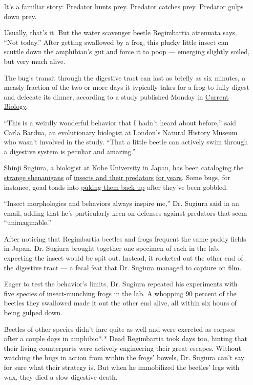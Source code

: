 It's a familiar story: Predator hunts prey. Predator catches prey.
Predator gulps down prey.

Usually, that's it. But the water scavenger beetle Regimbartia attenuata
says, ``Not today.'' After getting swallowed by a frog, this plucky
little insect can scuttle down the amphibian's gut and force it to poop
--- emerging slightly soiled, but very much alive.

The bug's transit through the digestive tract can last as briefly as six
minutes, a measly fraction of the two or more days it typically takes
for a frog to fully digest and defecate its dinner, according to a study
published Monday in
\href{http://dx.doi.org/10.1016/j.cub.2020.06.026}{Current Biology}.

``This is a weirdly wonderful behavior that I hadn't heard about
before,'' said Carla Bardua, an evolutionary biologist at London's
Natural History Museum who wasn't involved in the study. ``That a little
beetle can actively swim through a digestive system is peculiar and
amazing.''

Shinji Sugiura, a biologist at Kobe University in Japan, has been
cataloging the
\href{https://royalsocietypublishing.org/doi/10.1098/rsbl.2017.0647}{strange
shenanigans} of \href{https://peerj.com/articles/5942/}{insects and
their predators}
\href{https://onlinelibrary.wiley.com/doi/abs/10.1111/ens.12423}{for
years}. Some bugs, for instance, goad toads into
\href{https://www.nytimes.com/2018/02/06/science/bombardier-beetle-toad-vomit.html}{puking
them back up} after they've been gobbled.

``Insect morphologies and behaviors always inspire me,'' Dr. Sugiura
said in an email, adding that he's particularly keen on defenses against
predators that seem ``unimaginable.''

After noticing that Regimbartia beetles and frogs frequent the same
paddy fields in Japan, Dr. Sugiura brought together one specimen of each
in the lab, expecting the insect would be spit out. Instead, it rocketed
out the other end of the digestive tract --- a fecal feat that Dr.
Sugiura managed to capture on film.

Eager to test the behavior's limits, Dr. Sugiura repeated his
experiments with five species of insect-munching frogs in the lab. A
whopping 90 percent of the beetles they swallowed made it out the other
end alive, all within six hours of being gulped down.

Beetles of other species didn't fare quite as well and were excreted as
corpses after a couple days in amphibio*.* Dead Regimbartia took days
too, hinting that their living counterparts were actively engineering
their great escapes. Without watching the bugs in action from within the
frogs' bowels, Dr. Sugiura can't say for sure what their strategy is.
But when he immobilized the beetles' legs with wax, they died a slow
digestive death.

